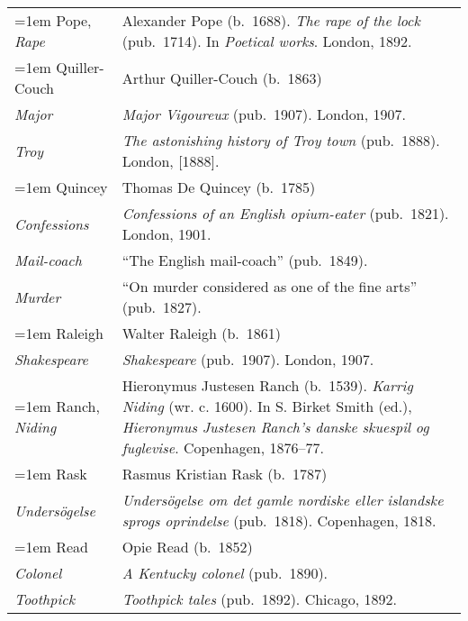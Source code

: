 \begin{xltabular}{\textwidth}{ lQ }
\hangindent=1em  Pope, \textit{Rape} & Alexander Pope (b.~1688). \textit{The rape of the lock} (pub.~1714). In \textit{Poetical works}. London, 1892. \\

\hangindent=1em  Quiller-Couch & Arthur Quiller-Couch (b.~1863) \\
\hspace{1em}\textit{Major} & \textit{Major Vigoureux} (pub.~1907). London, 1907.  \\
\hspace{1em}\textit{Troy} & \textit{The astonishing history of Troy town} (pub.~1888). London, {[}1888{]}. \\

\hangindent=1em  Quincey & Thomas De Quincey (b.~1785) \\
\hspace{1em}\textit{Confessions} & \textit{Confessions of an English opium-eater} (pub.~1821). London, 1901. \\
\hspace{1em}\textit{Mail-coach} & ``The English mail-coach'' (pub.~1849). \\
\hspace{1em}\textit{Murder} & ``On murder considered as one of the fine arts'' (pub.~1827). \\

\hangindent=1em  Raleigh  & Walter Raleigh (b.~1861)\\
\hspace{1em}\textit{Shakespeare} & \textit{Shakespeare} (pub.~1907). London, 1907. \\

\hangindent=1em  Ranch, \textit{Niding} & Hieronymus Justesen Ranch (b.~1539). \textit{Karrig Niding} (wr. c. 1600). In S. Birket Smith (ed.), \textit{Hieronymus Justesen Ranch's danske skuespil og fuglevise}. Copenhagen, 1876--77. \\ %

\hangindent=1em  Rask & Rasmus Kristian Rask (b.~1787)\\
\hspace{1em}\textit{Undersögelse} &  \textit{Undersögelse om det gamle nordiske eller islandske sprogs oprindelse} (pub.~1818). Copenhagen, 1818.\\

\pagebreak
\hangindent=1em  Read & Opie Read (b.~1852) \\
\hspace{1em}\textit{Colonel} & \textit{A Kentucky colonel} (pub.~1890). \\
\hspace{1em}\textit{Toothpick} & \textit{Toothpick tales} (pub.~1892). Chicago, 1892. \\


\end{xltabular}
